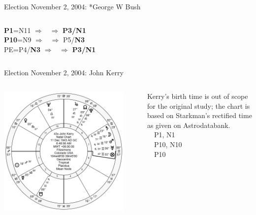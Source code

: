 \begin{frame}[t]{Election November 2, 2004: *George W Bush}
\begin{columns}[T, onlytextwidth]
\textbf{\dgreen P1}=N11
	$\Rightarrow$ \Mercury\, $\Rightarrow$ \textbf{\dgreen P3/N1}\\
\textbf{\red P10}=N9
	$\Rightarrow$ \Jupiter\, $\Rightarrow$ P5/\textbf{\dgreen N3}\\
PE=P4/\textbf{\dgreen N3}
	 $\Rightarrow$ \Mercury\, $\Rightarrow$ \textbf{\dgreen P3/N1}

\end{columns}
\end{frame}

\begin{frame}[t]{Election November 2, 2004: John Kerry}
\small
\begin{columns}[T, onlytextwidth]
\vspace{-1em}
{\includegraphics[width=0.9\textwidth]{charts/Kerry.png}}
\fontsize{7pt}{8pt}\selectfont

Kerry's birth time is out of scope for the original study; the chart is based on Starkman's rectified time as given on Astrodatabank.\\
\vspace{0.5em}
\Jupiter\, \Trine\, P1, N1 \\
\Mercury\, \Trine\, P10, N10 \\
\Venus\, \Sextile\, P10


\end{columns}
\end{frame}
